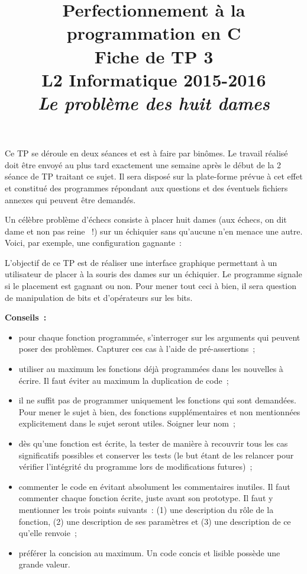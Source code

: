 \documentclass[12pt]{article}
\date{}
\title{{\bf Perfectionnement à la programmation en {\sf C}} \\
    Fiche de TP 3 \\
    {\small L2 Informatique 2015-2016} \\
    {\it \small Le problème des huit dames}}
\theoremstyle{definition}
\begin{document}
\maketitle

Ce TP se déroule en deux séances et est à faire par binômes.
Le travail réalisé doit être envoyé au plus tard exactement une
semaine après le début de la 2\ieme{} séance de TP traitant ce sujet. Il
sera disposé sur la plate-forme prévue à cet effet et constitué des
programmes répondant aux questions et des éventuels fichiers annexes qui
peuvent être demandés.
\bigskip
\bigskip

Un célèbre problème d'échecs consiste à placer huit dames
(aux échecs, on dit \og dame \fg{} et non pas \og reine \fg{}~!) sur un
échiquier sans qu'aucune n'en menace une autre. Voici, par exemple, une
configuration gagnante~:
\begin{center}\showboard\end{center}
\smallskip

L'objectif de ce TP est de réaliser une interface graphique permettant
à un utilisateur de placer à la souris des dames sur un échiquier. Le
programme signale si le placement est gagnant ou non. Pour mener tout
ceci à bien, il sera question de manipulation de bits et d'opérateurs
sur les bits.
\bigskip
\bigskip

{\bf Conseils~:}
\begin{itemize}
    \item pour chaque fonction programmée, s'interroger sur les arguments
    qui peuvent poser des problèmes. Capturer ces cas à l'aide de
    pré-assertions~;
    \item utiliser au maximum les fonctions déjà programmées dans les
    nouvelles à écrire. Il faut éviter au maximum la duplication de code~;
    \item il ne suffit pas de programmer uniquement les fonctions qui sont
    demandées. Pour mener le sujet à bien, des fonctions supplémentaires
    et non mentionnées explicitement dans le sujet seront utiles. Soigner
    leur nom~;
    \item dès qu'une fonction est écrite, la tester de manière à
    recouvrir tous les cas significatifs possibles et conserver les tests
    (le but étant de les relancer pour vérifier l'intégrité du
    programme lors de modifications futures)~;
    \item commenter le code en évitant absolument les commentaires inutiles.
    Il faut commenter chaque fonction écrite, juste avant son prototype.
    Il faut y mentionner les trois points suivants~: (1) une description
    du rôle de la fonction, (2) une description de ses paramètres et (3)
    une description de ce qu'elle renvoie~;
    \item préférer la concision au maximum. Un code concis et lisible
    possède une grande valeur.
\end{itemize}
\bigskip
\bigskip
\end{document}
